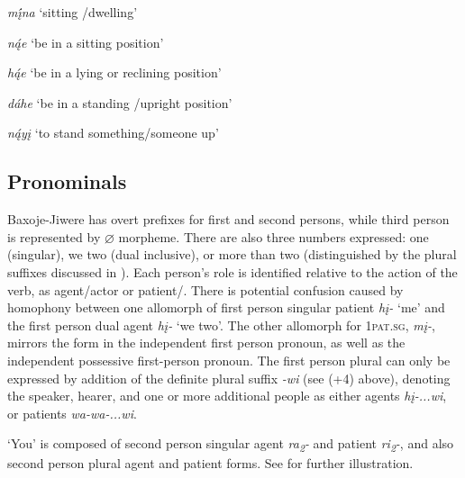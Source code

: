 \documentclass[output=paper]{LSP/langsci}
\begin{document}
\hspace{2em} \textit{m\k{\'i}na}  `sitting /dwelling'

\hspace{2em} \textit{n\k{á}e} `be in a sitting position'

\hspace{2em} \textit{h\k{á}e}  `be in a lying or reclining position'

\hspace{2em} \textit{dáhe}  `be in a standing /upright position'

\hspace{2em} \textit{n\k{á}y\k{i}}   `to stand something/someone up'

\subsection{Pronominals}
Baxoje-Jiwere has overt prefixes for first and second persons, while third person is represented by $\varnothing$ morpheme.  There are also three numbers expressed:  one (singular), we two (dual inclusive), or more than two (distinguished by the plural suffixes discussed in ).  Each person's role is identified relative to the action of the verb, as agent/actor or patient/. There is potential confusion caused by homophony between one allomorph of first person singular patient \textit{h\k{i}-} `me' and the first person dual agent \textit{h\k{i}-} `we two'.  The other allomorph for 1\textsc{pat.sg}, \textit{m\k{i}-}, mirrors the form in the independent first person pronoun, as well as the independent possessive first-person pronoun.  The first person plural can only be expressed by addition of the definite plural suffix \textit{-wi} (see (+4) above), denoting the speaker, hearer, and one or more additional people as either agents \textit{h\k{i}-...wi}, or patients \textit{wa-wa-...wi}.  

`You' is composed of second person singular agent \textit{ra\textsubscript{2}-} and patient \textit{ri\textsubscript{2}-}, and also second person plural agent and patient forms.  See  for further illustration. 
\end{document}
